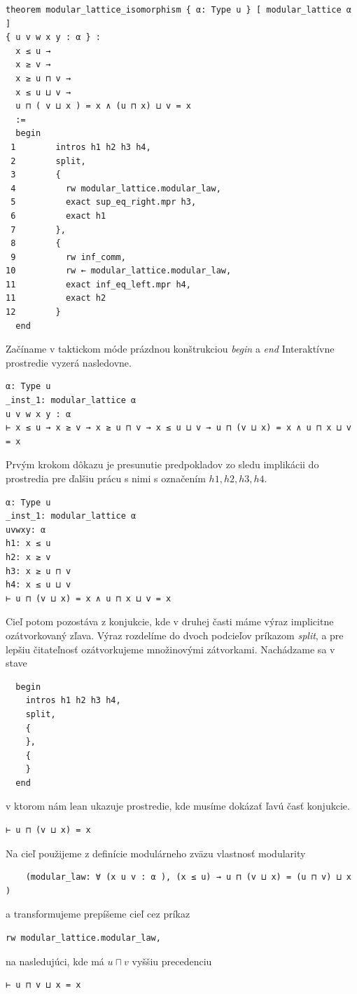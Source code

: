 \documentclass[a4paper,10pt,oneside]{report}%
\begin{document}
\begin{lstlisting}
theorem modular_lattice_isomorphism { α: Type u } [ modular_lattice α ]
{ u v w x y : α } :
  x ≤ u →
  x ≥ v →
  x ≥ u ⊓ v →
  x ≤ u ⊔ v →
  u ⊓ ( v ⊔ x ) = x ∧ (u ⊓ x) ⊔ v = x
  :=
  begin
 1        intros h1 h2 h3 h4,
 2        split,
 3        {
 4          rw modular_lattice.modular_law,
 5          exact sup_eq_right.mpr h3,
 6          exact h1
 7        },
 8        {
 9          rw inf_comm,
10          rw ← modular_lattice.modular_law,
11          exact inf_eq_left.mpr h4,
11          exact h2
12        }
  end
\end{lstlisting}
    Začíname v taktickom móde prázdnou konštrukciou \emph{begin} a \emph{end}
    Interaktívne prostredie vyzerá nasledovne.
\begin{lstlisting}
α: Type u
_inst_1: modular_lattice α
u v w x y : α
⊢ x ≤ u → x ≥ v → x ≥ u ⊓ v → x ≤ u ⊔ v → u ⊓ (v ⊔ x) = x ∧ u ⊓ x ⊔ v = x
\end{lstlisting}
    Prvým krokom dôkazu je presunutie predpokladov zo sledu implikácii do
prostredia pre ďalšiu prácu s nimi s označením $h1,h2,h3,h4$.
\begin{lstlisting}
α: Type u
_inst_1: modular_lattice α
uvwxy: α
h1: x ≤ u
h2: x ≥ v
h3: x ≥ u ⊓ v
h4: x ≤ u ⊔ v
⊢ u ⊓ (v ⊔ x) = x ∧ u ⊓ x ⊔ v = x
\end{lstlisting}
    Cieľ potom pozostáva z konjukcie, kde v druhej časti máme výraz implicitne
ozátvorkovaný zľava.
    Výraz rozdelíme do dvoch podcieľov príkazom \emph{split}, a pre lepšiu
čitateľnosť ozátvorkujeme množinovými zátvorkami. Nachádzame sa v stave
\begin{lstlisting}
  begin
    intros h1 h2 h3 h4,
    split,
    {
    },
    {
    }
  end
\end{lstlisting}
v ktorom nám lean ukazuje prostredie, kde musíme dokázať ľavú časť konjukcie.
\begin{lstlisting}
⊢ u ⊓ (v ⊔ x) = x
\end{lstlisting}
Na cieľ použijeme z definície modulárneho zväzu vlastnosť modularity
\begin{lstlisting}
    (modular_law: ∀ (x u v : α ), (x ≤ u) → u ⊓ (v ⊔ x) = (u ⊓ v) ⊔ x )
\end{lstlisting}
a transformujeme prepíšeme cieľ cez príkaz
\begin{lstlisting}
rw modular_lattice.modular_law,
\end{lstlisting}
na nasledujúci, kde má $u \sqcap v$ vyššiu precedenciu
\begin{lstlisting}
⊢ u ⊓ v ⊔ x = x
\end{lstlisting}
\end{document}
